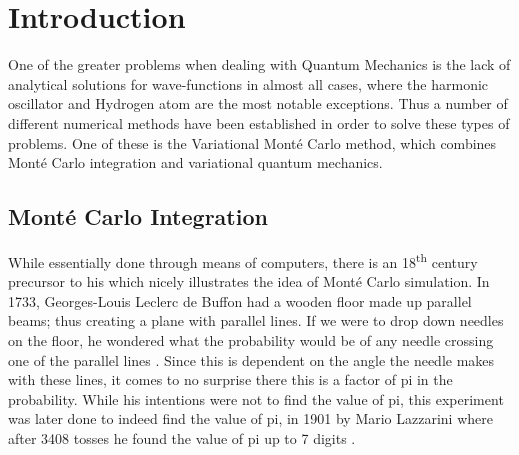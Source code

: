 

\section{Introduction}
One of the greater problems when dealing with Quantum Mechanics is the lack of analytical solutions for wave-functions
in almost all cases, where the harmonic oscillator and Hydrogen atom are the most notable exceptions.
Thus a number of different numerical methods have been established in order to solve these types
of problems. One of these is the Variational Mont\'e Carlo method, which combines Mont\'e Carlo integration and variational
quantum mechanics.


\subsection{Mont\'e Carlo Integration}
\label{ch:monte}
While essentially done through means of computers, there is an 18\textsuperscript{th} century precursor to
his which nicely illustrates the idea of Mont\'e Carlo simulation. In 1733, Georges-Louis Leclerc
de Buffon had a wooden floor made up parallel beams; thus creating a plane with parallel lines.
If we were to drop down needles on the floor, he wondered what the probability would be of
any needle crossing one of the parallel lines \cite{Buffon}. Since this is dependent on the
angle the needle makes with these lines, it comes to no surprise there this is a factor of pi
in the probability. While his intentions were not to find the value of pi, this experiment
was later done to indeed find the value of pi, in 1901 by Mario Lazzarini where after 3408
tosses he found the value of pi up to 7 digits \cite{Lazzarini}.


